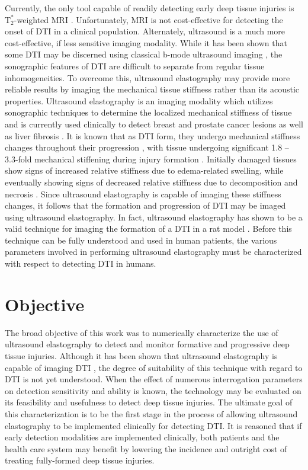 		Currently, the only tool capable of readily detecting early deep tissue injuries is $\mathrm{T}_2^*$-weighted MRI \cite{stekelenburg06,loerakker11}. Unfortunately, MRI is not cost-effective for detecting the onset of DTI in a clinical population. Alternately, ultrasound is a much more cost-effective, if less sensitive imaging modality. While it has been shown that some DTI may be discerned using classical b-mode ultrasound imaging \cite{aoi08, kanno09}, the sonographic features of DTI are difficult to separate from regular tissue inhomogeneities. To overcome this, ultrasound elastography may provide more reliable results by imaging the mechanical tissue stiffness rather than its acoustic properties. Ultrasound elastography is an imaging modality which utilizes sonographic techniques to determine the localized mechanical stiffness of tissue and is currently used clinically to detect breast and prostate cancer lesions \cite{tanter08, konig05} as well as liver fibrosis \cite{sandrin03}. It is known that as DTI form, they undergo mechanical stiffness changes throughout their progression \cite{linderganz04,oomens10,solis12-03}, with tissue undergoing significant 1.8 -- 3.3-fold mechanical stiffening during injury formation \cite{gefen05}. Initially damaged tissues show signs of increased relative stiffness due to edema-related swelling, while eventually showing signs of decreased relative stiffness due to decomposition and necrosis \cite{gefen09}. Since ultrasound elastography is capable of imaging these stiffness changes, it follows that the formation and progression of DTI may be imaged using ultrasound elastography. In fact, ultrasound elastography has shown to be a valid technique for imaging the formation of a DTI in a rat model \cite{deprez11}. Before this technique can be fully understood and used in human patients, the various parameters involved in performing ultrasound elastography must be characterized with respect to detecting DTI in humans.

	\section{Objective}
		The broad objective of this work was to numerically characterize the use of ultrasound elastography to detect and monitor formative and progressive deep tissue injuries. Although it has been shown that ultrasound elastography is capable of imaging DTI \cite{deprez11}, the degree of suitability of this technique with regard to DTI is not yet understood. When the effect of numerous interrogation parameters on detection sensitivity and ability is known, the technology may be evaluated on its feasibility and usefulness to detect deep tissue injuries. The ultimate goal of this characterization is to be the first stage in the process of allowing ultrasound elastography to be implemented clinically for detecting DTI. It is reasoned that if early detection modalities are implemented clinically, both patients and the health care system may benefit by lowering the incidence and outright cost of treating fully-formed deep tissue injuries.

